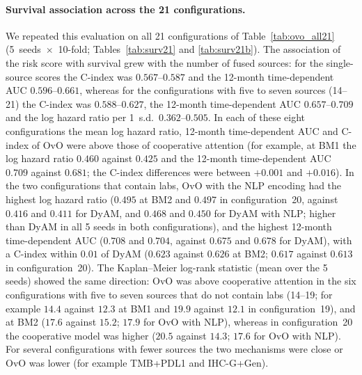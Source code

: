 \paragraph{Survival association across the 21 configurations.}
We repeated this evaluation on all 21 configurations of Table~\ref{tab:ovo_all21} (5~seeds~$\times$~10-fold; Tables~\ref{tab:surv21} and \ref{tab:surv21b}).
The association of the risk score with survival grew with the number of fused sources: for the single-source scores
the C-index was $0.567$--$0.587$ and the 12-month time-dependent AUC $0.596$--$0.661$, whereas for the configurations with five to
seven sources (14--21) the C-index was $0.588$--$0.627$, the 12-month time-dependent AUC $0.657$--$0.709$ and the log hazard ratio per
1~s.d.\ $0.362$--$0.505$.
In each of these eight configurations the mean log hazard ratio, 12-month time-dependent AUC and C-index of OvO were above those of cooperative attention
(for example, at BM1 the log hazard ratio $0.460$ against $0.425$ and the 12-month time-dependent AUC $0.709$ against $0.681$; the C-index differences were
between $+0.001$ and $+0.016$).
In the two configurations that contain labs, OvO with the NLP encoding had the highest log hazard ratio ($0.495$ at BM2 and $0.497$ in configuration~20,
against $0.416$ and $0.411$ for DyAM, and $0.468$ and $0.450$ for DyAM with NLP; higher than DyAM in all 5 seeds in both configurations),
and the highest 12-month time-dependent AUC ($0.708$ and $0.704$, against $0.675$ and $0.678$ for DyAM), with a C-index within $0.01$ of DyAM
($0.623$ against $0.626$ at BM2; $0.617$ against $0.613$ in configuration~20).
The Kaplan--Meier log-rank statistic (mean over the 5 seeds) showed the same direction: OvO was above cooperative attention in the six configurations with five to seven sources that do not contain labs (14--19; for example $14.4$ against $12.3$ at BM1 and $19.9$ against $12.1$ in configuration~19), and at BM2 ($17.6$ against $15.2$; $17.9$ for OvO with NLP), whereas in configuration~20 the cooperative model was higher ($20.5$ against $14.3$; $17.6$ for OvO with NLP).
For several configurations with fewer sources the two mechanisms were close or OvO was lower (for example TMB+PDL1 and IHC-G+Gen).





